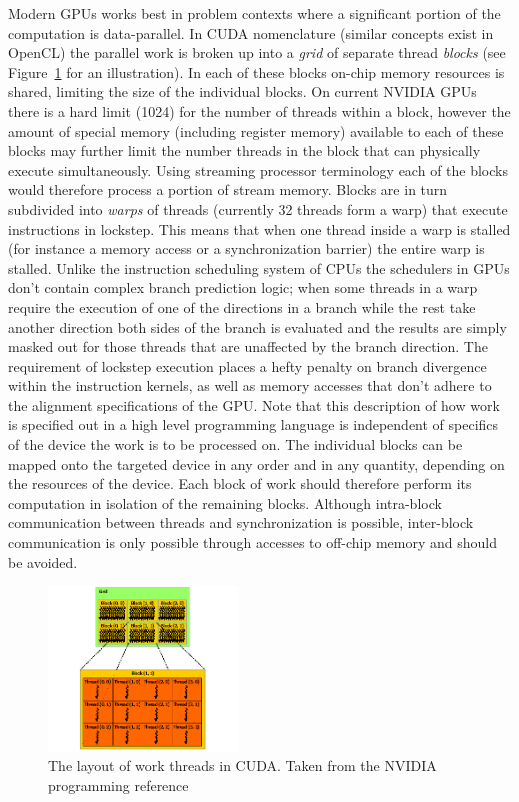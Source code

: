 Modern GPUs works best in problem contexts where a significant portion of the computation is data-parallel. In CUDA nomenclature (similar concepts exist in OpenCL) the parallel work is broken up into a \textit{grid} of
separate thread \textit{blocks} (see Figure~\ref{fig_grid_blocks} for an illustration). In each of these blocks on-chip memory resources is shared, limiting the size of the individual blocks. On current NVIDIA GPUs there is a hard limit (1024) for the number of 
threads within a block, however the amount of special memory (including register memory) available to each of these blocks may further limit the number threads in the block that can physically execute simultaneously. Using streaming processor terminology 
each of the blocks would therefore process a portion of stream memory. Blocks are in turn subdivided into \textit{warps} of threads (currently 32 threads form a warp) that execute instructions in lockstep. This means that when one
thread inside a warp is stalled (for instance a memory access or a synchronization barrier) the entire warp is stalled. Unlike the instruction scheduling system of CPUs the schedulers in GPUs don't contain complex branch prediction logic; when some
threads in a warp require the execution of one of the directions in a branch while the rest take another direction both sides of the branch is evaluated and the results are simply masked out for those threads that are unaffected
by the branch direction. The requirement of lockstep execution places a hefty penalty on branch divergence within the instruction kernels, as well as memory accesses that don't adhere to the alignment specifications of the GPU. Note that this description of how work 
is specified out in a high level programming language is independent of specifics of the device the work is to be processed on. The individual blocks can be mapped onto the targeted device 
in any order and in any quantity, depending on the resources of the device. Each block of work should therefore perform its computation in isolation of the remaining blocks. Although 
intra-block communication between threads and synchronization is possible, inter-block communication is only possible through accesses to off-chip memory and should be avoided.
\begin{figure}[ht!]
 \begin{mdframed}
  \centering
  \includegraphics[width=0.45\textwidth]{images/grid-of-thread-blocks.png}
  \caption[Thread layout in CUDA]{The layout of work threads in CUDA. Taken from the NVIDIA programming reference \cite{cuda}}
  \label{fig_grid_blocks}
 \end{mdframed}
\end{figure}

